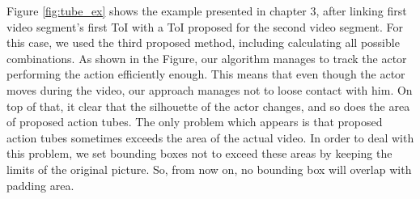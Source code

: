 Figure \ref{fig:tube_ex} shows the example presented in chapter 3, after linking first video segment's first ToI with a ToI proposed for the second video segment. For this case, we used the third proposed method, including calculating all possible combinations. As shown in the Figure,
our algorithm manages to track the actor performing the action efficiently enough. This means that even though the actor moves during the
video, our approach manages not to loose contact with him. On top of that, it clear that the silhouette of the actor changes, and so does the area of proposed action tubes. The only problem which appears is that proposed action tubes sometimes exceeds the area of the actual video.
In order to deal with this problem, we set bounding boxes not to exceed these areas by keeping the limits of the original picture. So,
from now on, no bounding box will overlap with padding area.
% 
